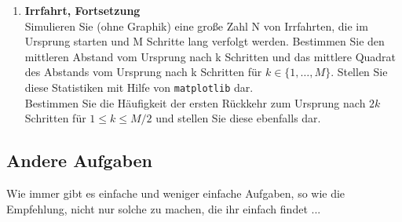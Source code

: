 \begin{enumerate}[1.]
\item \textbf{Irrfahrt, Fortsetzung}\\
Simulieren Sie (ohne Graphik) eine große Zahl N von Irrfahrten,
die im Ursprung starten und M Schritte lang verfolgt werden.
Bestimmen Sie den mittleren Abstand vom Ursprung nach k Schritten
und das mittlere Quadrat des Abstands vom Ursprung nach k Schritten
für $k\in\{1,\ldots,M\}$. Stellen Sie diese Statistiken mit Hilfe von
\texttt{matplotlib} dar.\\
Bestimmen Sie die Häufigkeit der ersten Rückkehr zum Ursprung nach
$2k$ Schritten für $1\leq k\leq M/2$ und stellen Sie diese ebenfalls 
dar. 

\end{enumerate}

\subsection*{Andere Aufgaben}

Wie immer gibt es einfache und weniger einfache Aufgaben, so wie die Empfehlung,
nicht nur solche zu machen, die ihr einfach findet ...

